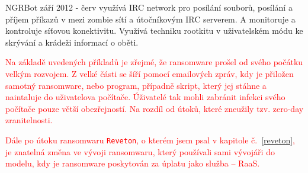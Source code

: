 \documentclass[a4paper,12pt]{article}
\begin{document}
NGRBot září 2012 - červ využívá IRC network pro posílání souborů, posílání a příjem příkazů v mezi zombie sítí a útočníkovým IRC serverem. A monitoruje  a kontroluje síťovou konektivitu. Využívá techniku rootkitu v uživatelském módu ke skrývání a krádeži  informací o oběti.


\textcolor{red}{Na základě uvedených příkladů je zřejmé, že ransomware prošel od svého počátku velkým rozvojem. Z velké části se šíří pomocí emailových zpráv, kdy je přiložen samotný ransomware, nebo program, případně skript, který jej stáhne a naintaluje do uživatelova počítače. Úživatelé tak mohli zabránit infekci svého počítače pouze větší obezřejností. Na rozdíl od útoků, které zneužily tzv. zero-day zranitelnosti.}

\textcolor{red}{Dále po útoku ransomwaru \texttt{Reveton}, o kterém jsem psal v kapitole č.~\ref{reveton}, je znatelná změna ve vývoji ransomwaru, který používali sami vývojáři do modelu, kdy je ransomware poskytován za úplatu jako služba -- RaaS.}




\OdsazovaniOdstavcuStop
\end{document}
